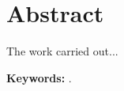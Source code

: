 \chapter*{Abstract}
\label{cha:abstract}


The work carried out...

\textbf{Keywords:} \mybookkeywords.
